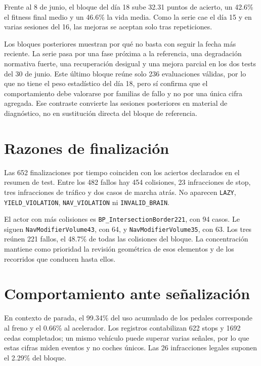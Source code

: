 Frente al 8 de junio, el bloque del día 18 sube 32.31 puntos de acierto, un 42.6\% el fitness final medio y un 46.6\% la vida media. Como la serie cae el día 15 y en varias sesiones del 16, las mejoras se aceptan solo tras repeticiones.

Los bloques posteriores muestran por qué no basta con seguir la fecha más reciente. La serie pasa por una fase próxima a la referencia, una degradación normativa fuerte, una recuperación desigual y una mejora parcial en los dos tests del 30 de junio. Este último bloque reúne solo 236 evaluaciones válidas, por lo que no tiene el peso estadístico del día 18, pero sí confirma que el comportamiento debe valorarse por familias de fallo y no por una única cifra agregada. Ese contraste convierte las sesiones posteriores en material de diagnóstico, no en sustitución directa del bloque de referencia.

\section{Razones de finalización}

Las 652 finalizaciones por tiempo coinciden con los aciertos declarados en el resumen de test. Entre los 482 fallos hay 454 colisiones, 23 infracciones de stop, tres infracciones de tráfico y dos casos de marcha atrás. No aparecen \texttt{LAZY}, \texttt{YIELD\_VIOLATION}, \texttt{NAV\_VIOLATION} ni \texttt{INVALID\_BRAIN}.

El actor con más colisiones es \texttt{BP\_IntersectionBorder221}, con 94 casos. Le siguen \texttt{NavModifierVolume43}, con 64, y \texttt{NavModifierVolume35}, con 63. Los tres reúnen 221 fallos, el 48.7\% de todas las colisiones del bloque. La concentración mantiene como prioridad la revisión geométrica de esos elementos y de los recorridos que conducen hasta ellos.

\section{Comportamiento ante señalización}

En contexto de parada, el 99.34\% del uso acumulado de los pedales corresponde al freno y el 0.66\% al acelerador. Los registros contabilizan 622 stops y 1692 cedas completados; un mismo vehículo puede superar varias señales, por lo que estas cifras miden eventos y no coches únicos. Las 26 infracciones legales suponen el 2.29\% del bloque.

